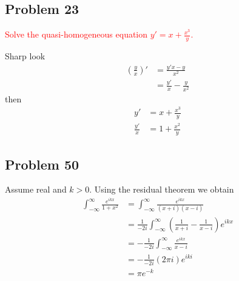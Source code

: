 \documentclass[../main.tex]{subfiles}
\begin{document}
\subsection{Problem 23}
\textcolor{red}{Solve the quasi-homogeneous equation $y'=x+\frac{x^3}{y}$.}

Sharp look
\begin{align}
\left(\frac{y}{x}\right)'
&=\frac{y'x-y}{x^2}\\
&=\frac{y'}{x}-\frac{y}{x^2}
\end{align}
then
\begin{align}
y'&=x+\frac{x^3}{y}\\
\frac{y'}{x}&=1+\frac{x^2}{y}
\end{align}

\subsection{Problem 50}
Assume real and $k>0$. Using the residual theorem we obtain
\begin{align}
\int_{-\infty}^\infty\frac{e^{ikx}}{1+x^2}
&=\int_{-\infty}^\infty\frac{e^{ikx}}{(x+i)(x-i)}\\
&=\frac{1}{-2i}\int_{-\infty}^\infty\left(\frac{1}{x+i}-\frac{1}{x-i}\right)e^{ikx}\\
&=-\frac{1}{-2i}\int_{-\infty}^\infty\frac{e^{ikx}}{x-i}\\
&=-\frac{1}{-2i}(2\pi i) e^{iki}\\
&=\pi e^{-k}
\end{align}
\end{document}
